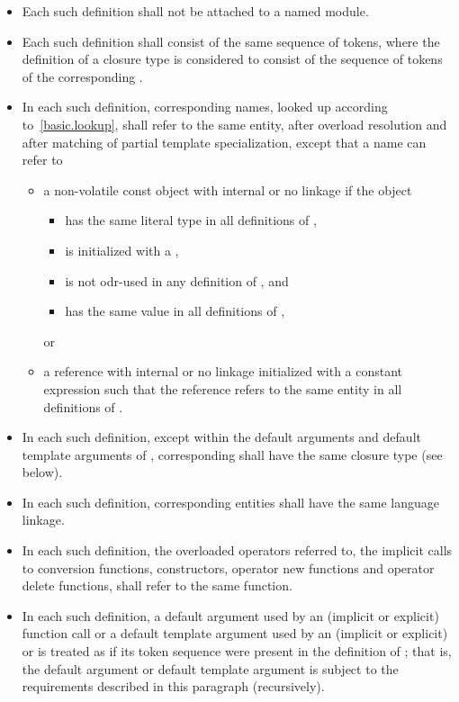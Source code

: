 \begin{itemize}
\item Each such definition
shall not be attached to a named module.
\item Each such definition shall consist of
the same sequence of tokens,
where the definition of a closure type
is considered to consist of the sequence of tokens of
the corresponding .
\item In each such definition, corresponding names, looked up
according to~\ref{basic.lookup}, shall refer to the same entity, after
overload resolution and after matching of partial
template specialization, except that a name can refer to
\begin{itemize}
\item
a non-volatile const object with internal or no linkage if the object
\begin{itemize}
\item has the same literal type in all definitions of ,
\item is initialized with a ,
\item is not odr-used in any definition of , and
\item has the same value in all definitions of ,
\end{itemize}
or
\item
a reference with internal or no linkage
initialized with a constant expression such that
the reference refers to the same entity in all definitions of .
\end{itemize}

\item In each such definition, except within
the default arguments and default template arguments of ,
corresponding  shall have
the same closure type (see below).

\item In each such definition, corresponding entities shall have the
same language linkage.

\item In each such definition, the overloaded operators referred
to, the implicit calls to conversion functions, constructors, operator
new functions and operator delete functions, shall refer to the same
function.

\item In each such definition,
a default argument used by an (implicit or explicit) function call or
a default template argument used by an (implicit or explicit)
 or 
is treated as if its token sequence
were present in the definition of ;
that is, the default argument or default template argument
is subject to the requirements described in this paragraph (recursively).


\end{itemize}
